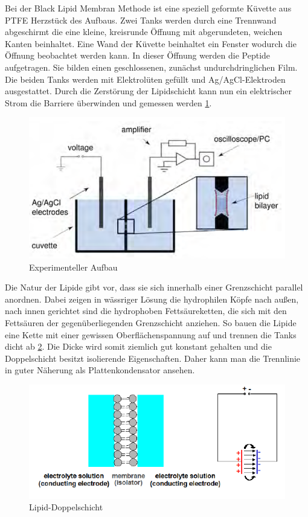 \documentclass{include/thesisclass3}
\begin{document}
Bei der Black Lipid Membran Methode ist eine speziell geformte Küvette aus PTFE Herzstück des Aufbaus. Zwei Tanks werden durch eine Trennwand abgeschirmt die eine kleine, kreisrunde Öffnung mit abgerundeten, weichen Kanten beinhaltet. Eine Wand der Küvette beinhaltet ein Fenster wodurch die Öffnung beobachtet werden kann. In dieser Öffnung werden die Peptide aufgetragen. Sie bilden einen geschlossenen, zunächst undurchdringlichen Film. Die beiden Tanks werden mit Elektrolüten gefüllt und Ag/AgCl-Elektroden ausgestattet. Durch die Zerstörung der Lipidschicht kann nun ein elektrischer Strom die Barriere überwinden und gemessen werden \ref{aufbau}.\\
\begin{figure}[ht]
	\begin{center}
		\includegraphics{images/experiment.png}
		\caption{Experimenteller Aufbau}
		\label{aufbau}
	\end{center}
\end{figure}
Die Natur der Lipide gibt vor, dass sie sich innerhalb einer Grenzschicht parallel anordnen. Dabei zeigen in wässriger Lösung die hydrophilen Köpfe nach außen, nach innen gerichtet sind die hydrophoben Fettsäureketten, die sich mit den Fettsäuren der gegenüberliegenden Grenzschicht anziehen. So bauen die Lipide eine Kette mit einer gewissen Oberflächenspannung auf und trennen die Tanks dicht ab \ref{double}. Die Dicke wird somit ziemlich gut konstant gehalten und die Doppelschicht besitzt isolierende Eigenschaften. Daher kann man die Trennlinie in guter Näherung als Plattenkondensator ansehen.\\
\begin{figure}[ht]
	\begin{center}
		\includegraphics{images/lipid-doublelayer.png}
		\caption{Lipid-Doppelschicht}
	\label{double}
	\end{center}
\end{figure}
\end{document}
